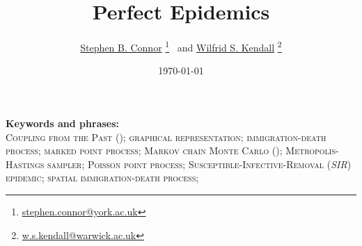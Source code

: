 \documentclass[]{article}
\newcommand{\Title}{Perfect Epidemics}
\newcommand{\Date}{\today}
\newcommand{\SIR}{\emph{SIR}\xspace}
\begin{document}
 \TrackingPreamble

 \title{\Title}
 \author{%
\href{http://maths.york.ac.uk/www/sbc502}{Stephen B. Connor}%
\footnote{\href{mailto:stephen.connor@york.ac.uk}%
{\scriptsize stephen.connor@york.ac.uk}}
\ and
\href{http://warwick.ac.uk/wsk}{Wilfrid S. Kendall}%
\footnote{\href{mailto:w.s.kendall@warwick.ac.uk}%
{\scriptsize w.s.kendall@warwick.ac.uk}}
}
 \date{\Date}
 \maketitle

\begin{abstract}\noindent
{}
\end{abstract}

\noindent
\textbf{Keywords and phrases:} \\
\textsc{
Coupling from the Past (\CFTP); 
graphical representation;
immigration-death process;
marked point process;
Markov chain Monte Carlo (\MCMC); 
Metro\-polis-Hastings sampler;
Poisson point process;
Susceptible-Infect\-ive-Removal (\SIR) epidemic; 
spatial immigration-death process;
}

\end{document}
